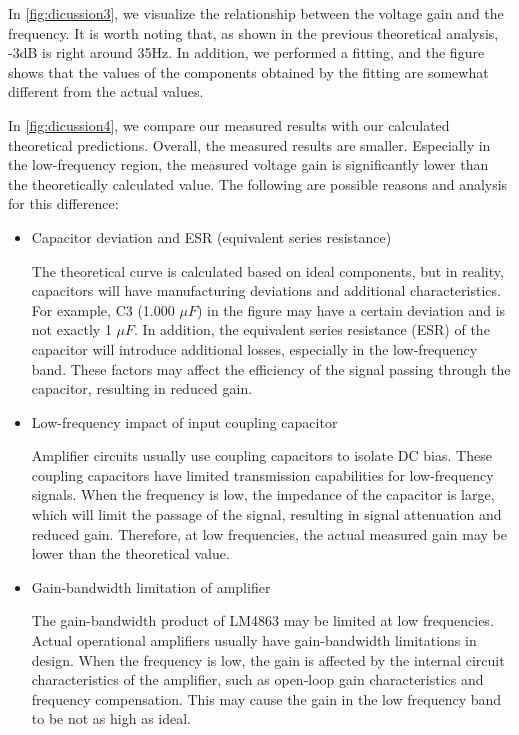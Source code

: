 \begin{enumerate}
	In \cref{fig:dicussion3}, we visualize the relationship between the voltage gain and the frequency. It is worth noting that, as shown in the previous theoretical analysis, -3dB is right around 35Hz. In addition, we performed a fitting, and the figure shows that the values ​​of the components obtained by the fitting are somewhat different from the actual values.
	
	In \cref{fig:dicussion4}, we compare our measured results with our calculated theoretical predictions. Overall, the measured results are smaller. Especially in the low-frequency region, the measured voltage gain is significantly lower than the theoretically calculated value. The following are possible reasons and analysis for this difference:
	\begin{itemize}
		\item Capacitor deviation and ESR (equivalent series resistance)
		
		The theoretical curve is calculated based on ideal components, but in reality, capacitors will have manufacturing deviations and additional characteristics. For example, C3 (1.000 $\mu F$) in the figure may have a certain deviation and is not exactly 1 $\mu F$. In addition, the equivalent series resistance (ESR) of the capacitor will introduce additional losses, especially in the low-frequency band. These factors may affect the efficiency of the signal passing through the capacitor, resulting in reduced gain.
		
		\item Low-frequency impact of input coupling capacitor
		
		Amplifier circuits usually use coupling capacitors to isolate DC bias. These coupling capacitors have limited transmission capabilities for low-frequency signals. When the frequency is low, the impedance of the capacitor is large, which will limit the passage of the signal, resulting in signal attenuation and reduced gain. Therefore, at low frequencies, the actual measured gain may be lower than the theoretical value.
		
		\item Gain-bandwidth limitation of amplifier
		
		The gain-bandwidth product of LM4863 may be limited at low frequencies. Actual operational amplifiers usually have gain-bandwidth limitations in design. When the frequency is low, the gain is affected by the internal circuit characteristics of the amplifier, such as open-loop gain characteristics and frequency compensation. This may cause the gain in the low frequency band to be not as high as ideal.
		

\end{itemize}
\end{enumerate}
